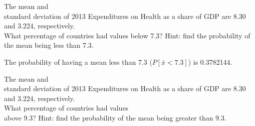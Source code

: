\documentclass[11pt]{book}\usepackage[]{graphicx}\usepackage[]{color}
\begin{document}
\begin{exercises}








		\begin{exercise}  %

	  The mean and \\ standard  deviation of 2013 Expenditures on Health as a share of GDP are 8.30 and 3.224, respectively.  \\ What percentage of countries had values below 7.3?   Hint: find the probability of the mean being less than 7.3.

	  \end{exercise}
	  \vspace{2cm}
	  \begin{solution}   %



    The probability of having a mean less than 7.3 ($P[ \bar{x} < 7.3 ]$) is 0.3782144.

	\end{solution}

			\begin{exercise}  %

	  The mean and \\ standard  deviation of 2013 Expenditures on Health as a share of GDP are 8.30 and 3.224, respectively.  \\ What percentage of countries had values \\ above 9.3?   Hint: find the probability of the mean being greater than 9.3.


\end{exercise}
\end{exercises}
\end{document}
